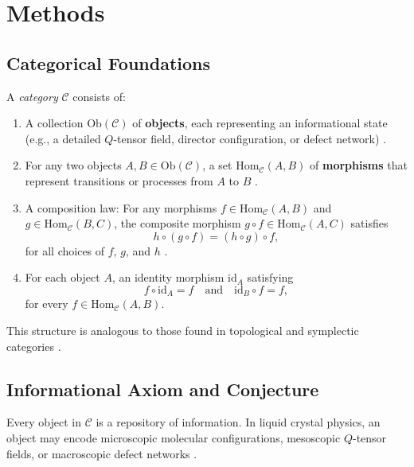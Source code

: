 	\section{Methods}
	
	\subsection{Categorical Foundations}
	
	A \emph{category} \(\mathcal{C}\) consists of:
	\begin{enumerate}[label=(\roman*)]
		\item A collection \(\mathrm{Ob}(\mathcal{C})\) of \textbf{objects}, each representing an informational state (e.g., a detailed \(Q\)-tensor field, director configuration, or defect network) \cite{maclane1971categories, spivak2014category}.
		\item For any two objects \(A,B \in \mathrm{Ob}(\mathcal{C})\), a set \(\mathrm{Hom}_{\mathcal{C}}(A,B)\) of \textbf{morphisms} that represent transitions or processes from \(A\) to \(B\) \cite{maclane1971categories}.
		\item A composition law: For any morphisms \(f \in \mathrm{Hom}_{\mathcal{C}}(A,B)\) and \(g \in \mathrm{Hom}_{\mathcal{C}}(B,C)\), the composite morphism \(g\circ f \in \mathrm{Hom}_{\mathcal{C}}(A,C)\) satisfies
		\[
		h\circ (g\circ f) = (h\circ g)\circ f,
		\]
		for all choices of \(f\), \(g\), and \(h\) \cite{maclane1971categories}.
		\item For each object \(A\), an identity morphism \(\mathrm{id}_A\) satisfying
		\[
		f\circ \mathrm{id}_A = f \quad \text{and} \quad \mathrm{id}_B\circ f = f,
		\]
		for every \(f \in \mathrm{Hom}_{\mathcal{C}}(A,B)\).
	\end{enumerate}
	
	This structure is analogous to those found in topological and symplectic categories \cite{weinstein1981symplectic, guillemin1984symplectic}.
	
	\subsection{Informational Axiom and Conjecture}
	
	\begin{axiom}
		Every object in \(\mathcal{C}\) is a repository of information. In liquid crystal physics, an object may encode microscopic molecular configurations, mesoscopic \(Q\)-tensor fields, or macroscopic defect networks \cite{degennes1993physics, spivak2014category}.
	\end{axiom}
	

